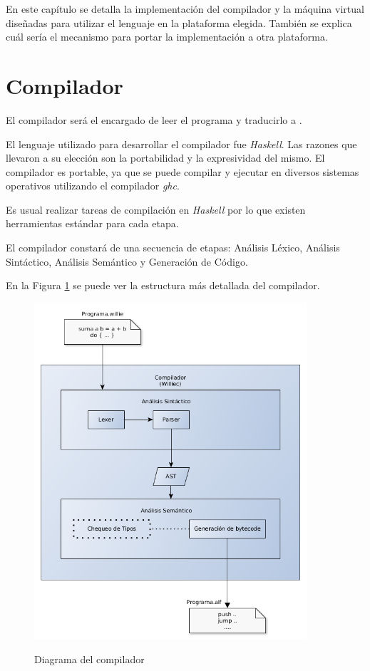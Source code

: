 
En este capítulo se detalla la implementación del compilador
y la máquina virtual diseñadas para utilizar el lenguaje
\frob{} en la plataforma elegida.
También se explica cuál sería el mecanismo para portar la
implementación a otra plataforma.


\section{Compilador}

  El compilador será el encargado de leer el programa \frob{} y traducirlo
a \alf{}.

  El lenguaje utilizado para desarrollar el compilador fue \textit{Haskell}.
  Las razones que llevaron a su elección son la portabilidad y la
expresividad del mismo.
  El compilador \compilador{} es portable, ya que se puede compilar y ejecutar
en diversos sistemas operativos utilizando el compilador \textit{ghc}.

  Es usual realizar tareas de compilación en \textit{Haskell} por lo que existen
herramientas estándar para cada etapa.

  El compilador constará de una secuencia de etapas: Análisis Léxico,
  Análisis Sintáctico, Análisis Semántico y Generación de Código.

  En la Figura \ref{fig:compiler} se puede ver la estructura más detallada
del compilador.

\begin{figure}[h!]
\begin{center}
\caption{Diagrama del compilador}
\includegraphics[width=0.9\textwidth]{graphs/compiler.png}
\label{fig:compiler}
\end{center}
\end{figure}


